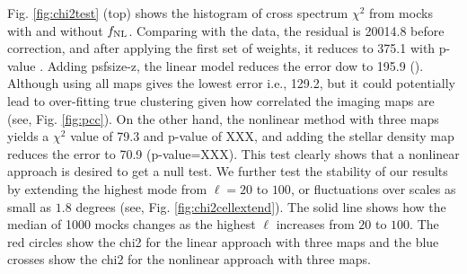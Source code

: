 Fig. \ref{fig:chi2test} (top) shows the histogram of cross spectrum $\chi^{2}$ from mocks with and without $f_{\rm NL}$. Comparing with the data, the residual is 20014.8 before correction, and after applying the first set of weights, it reduces to 375.1 with p-value . Adding psfsize-z, the linear model reduces the error dow to 195.9 (). Although using all maps gives the lowest error i.e., 129.2, but it could potentially lead to over-fitting true clustering given how correlated the imaging maps are (see, Fig. \ref{fig:pcc}). On the other hand, the nonlinear method with three maps yields a $\chi^{2}$ value of 79.3 and p-value of XXX, and adding the stellar density map reduces the error to 70.9 (p-value=XXX). This test clearly shows that a nonlinear approach is desired to get a null test. We further test the stability of our results by extending the highest mode from $\ell=20$ to $100$, or fluctuations over scales as small as $1.8$ degrees (see, Fig. \ref{fig:chi2cellextend}). The solid line shows how the median of 1000 mocks changes as the highest $\ell$ increases from $20$ to $100$. The red circles show the chi2 for the linear approach with three maps and the blue crosses show the chi2 for the nonlinear approach with three maps.


